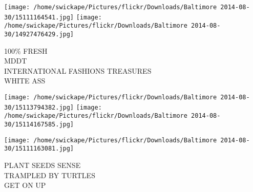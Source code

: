 \documentclass[10pt,letterpaper]{article}
\begin{document}
\texttt{[image: /home/swickape/Pictures/flickr/Downloads/Baltimore 2014-08-30/15111164541.jpg]}
\texttt{[image: /home/swickape/Pictures/flickr/Downloads/Baltimore 2014-08-30/14927476429.jpg]}

100\% FRESH\\
MDDT\\
INTERNATIONAL FASHIONS TREASURES\\
WHITE ASS\\
\pagebreak

\texttt{[image: /home/swickape/Pictures/flickr/Downloads/Baltimore 2014-08-30/15113794382.jpg]}
\texttt{[image: /home/swickape/Pictures/flickr/Downloads/Baltimore 2014-08-30/15114167585.jpg]}

\texttt{[image: /home/swickape/Pictures/flickr/Downloads/Baltimore 2014-08-30/15111163081.jpg]}

PLANT SEEDS SENSE\\
TRAMPLED BY TURTLES\\
GET ON UP\\
\pagebreak
\end{document}
